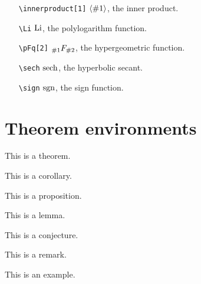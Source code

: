 \documentclass{article}
\begin{document}
\begin{itemize}
    \item[\texttt{\textbackslash innerproduct[1]}] $\left\langle{\#1}\right\rangle$, the inner product.
    \item[\texttt{\textbackslash Li}] $\operatorname{Li}$, the polylogarithm function.
    \item[\texttt{\textbackslash pFq[2]}] ${}_{\#1}F_{\#2}$, the hypergeometric function.
    \item[\texttt{\textbackslash sech}] $\operatorname{sech}$, the hyperbolic secant.
    \item[\texttt{\textbackslash sign}] $\operatorname{sgn}$, the sign function.
\end{itemize}

\section{Theorem environments}
\begin{theorem}
    This is a theorem.
\end{theorem}
\begin{corollary}
    This is a corollary.
\end{corollary}
\begin{proposition}
    This is a proposition.
\end{proposition}
\begin{lemma}
    This is a lemma.
\end{lemma}
\begin{conjecture}
    This is a conjecture.
\end{conjecture}

\begin{remark}
    This is a remark.
\end{remark}

\begin{example}
    This is an example.
\end{example}

\nocite{*}


\end{document}
